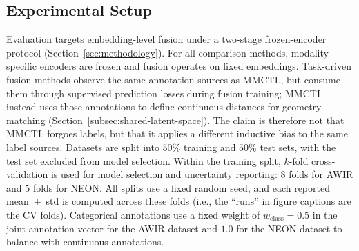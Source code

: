 \documentclass[10pt,twocolumn,letterpaper]{article}
\begin{document}
\subsection{Experimental Setup}
Evaluation targets embedding-level fusion under a two-stage frozen-encoder protocol (Section~\ref{sec:methodology}). For all comparison methods, modality-specific encoders are frozen and fusion operates on fixed embeddings. Task-driven fusion methods observe the same annotation sources as MMCTL, but consume them through supervised prediction losses during fusion training; MMCTL instead uses those annotations to define continuous distances for geometry matching (Section~\ref{subsec:shared-latent-space}). The claim is therefore not that MMCTL forgoes labels, but that it applies a different inductive bias to the same label sources. Datasets are split into $50\%$ training and $50\%$ test sets, with the test set excluded from model selection. Within the training split, $k$-fold cross-validation is used for model selection and uncertainty reporting: $8$ folds for AWIR and $5$ folds for NEON. All splits use a fixed random seed, and each reported mean~$\pm$~std is computed across these folds (i.e., the ``runs'' in figure captions are the CV folds). Categorical annotations use a fixed weight of $w_{\text{class}} = 0.5$ in the joint annotation vector for the AWIR dataset and $1.0$ for the NEON dataset to balance with continuous annotations.

\end{document}
